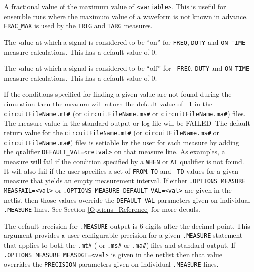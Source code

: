 \begin{Command}
\begin{Arguments}

A fractional value of the maximum value of \texttt{<variable>}.  This
is useful for ensemble runs where the maximum value of a waveform is
not known in advance.  {\tt FRAC\_MAX} is used by the {\tt TRIG} and
{\tt TARG} measures.


The value at which a signal is considered to be ``on'' for {\tt FREQ},
{\tt DUTY} and {\tt ON\_TIME} measure calculations.  This has a
default value of 0.


The value at which a signal is considered to be ``off'' for {\tt
FREQ}, {\tt DUTY} and {\tt ON\_TIME} measure calculations.  This has a
default value of 0.


If the conditions specified for finding a given value are not found
during the simulation then the measure will return the default value
of {\tt -1} in the \texttt{circuitFileName.mt\#}
(or \texttt{circuitFileName.ms\#} or \texttt{circuitFileName.ma\#})
files.  The measure value in the standard output or log file will be
FAILED.  The default return value for
the \texttt{circuitFileName.mt\#} (or \texttt{circuitFileName.ms\#}
or \texttt{circuitFileName.ma\#}) files is settable by the user for
each measure by adding the qualifier {\tt DEFAULT\_VAL=<retval>} on
that measure line.  As examples, a measure will fail if the condition
specified by a {\tt WHEN} or {\tt AT} qualifier is not found.  It will
also fail if the user specifies a set of {\tt FROM}, {\tt TO} and {\tt
TD} values for a given measure that yields an empty measurement
interval.  If either \texttt{.OPTIONS MEASURE MEASFAIL=<val>}
or \texttt{.OPTIONS MEASURE DEFAULT\_VAL=<val>} are given in the
netlist then those values override the \texttt{DEFAULT\_VAL}
parameters given on individual
\texttt{.MEASURE} lines.  See Section \ref{Options_Reference} for more details.


The default precision for {\tt .MEASURE} output is 6 digits after the
decimal point.  This argument provides a user configurable precision
for a given {\tt .MEASURE} statement that applies to both
the \texttt{.mt\#} ( or \texttt{.ms\#} or \texttt{.ma\#}) files and
standard output.  If \texttt{.OPTIONS MEASURE MEASDGT=<val>} is given
in the netlist then that value overrides the \texttt{PRECISION}
parameters given on individual \texttt{.MEASURE} lines.


\end{Arguments}
\end{Command}
